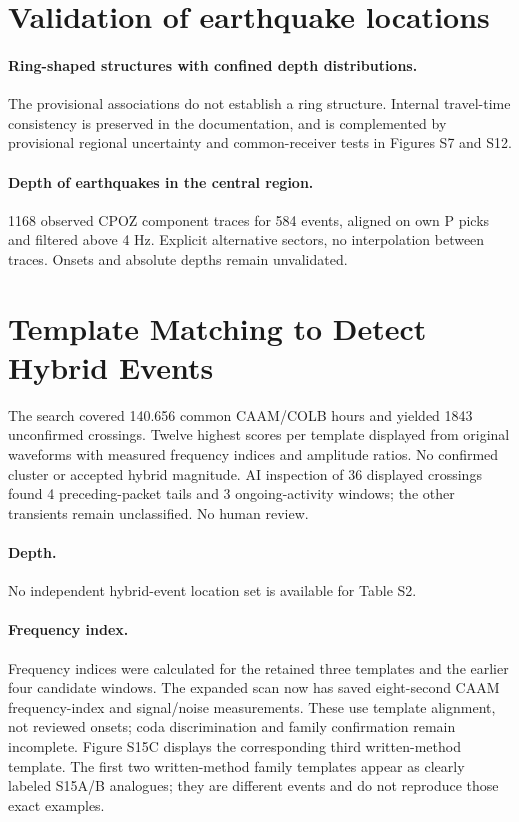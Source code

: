 \section{Validation of earthquake locations}
\paragraph{Ring-shaped structures with confined depth distributions.} The provisional associations do not establish a ring structure. Internal travel-time consistency is preserved in the documentation, and is complemented by provisional regional uncertainty and common-receiver tests in Figures S7 and S12.
\paragraph{Depth of earthquakes in the central region.} 1168 observed CPOZ component traces for 584 events, aligned on own P picks and filtered above 4 Hz. Explicit alternative sectors, no interpolation between traces. Onsets and absolute depths remain unvalidated.

\section{Template Matching to Detect Hybrid Events}
The search covered 140.656 common CAAM/COLB hours and yielded 1843 unconfirmed crossings. Twelve highest scores per template displayed from original waveforms with measured frequency indices and amplitude ratios. No confirmed cluster or accepted hybrid magnitude. AI inspection of 36 displayed crossings found 4 preceding-packet tails and 3 ongoing-activity windows; the other transients remain unclassified. No human review.

\paragraph{Depth.} No independent hybrid-event location set is available for Table S2.
\paragraph{Frequency index.} Frequency indices were calculated for the retained three templates and the earlier four candidate windows. The expanded scan now has saved eight-second CAAM frequency-index and signal/noise measurements. These use template alignment, not reviewed onsets; coda discrimination and family confirmation remain incomplete. Figure S15C displays the corresponding third written-method template. The first two written-method family templates appear as clearly labeled S15A/B analogues; they are different events and do not reproduce those exact examples.
